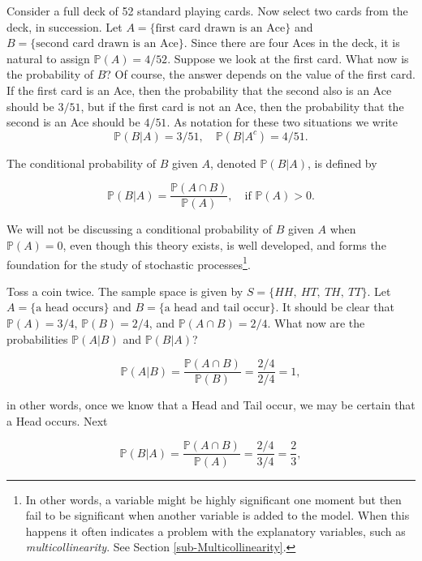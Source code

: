 \documentclass[]{book}
\let\rmarkdownfootnote\footnote%
\def\footnote{\protect\rmarkdownfootnote}
\numberwithin{equation}{chapter}
\numberwithin{figure}{chapter}
\theoremstyle{plain}
\theoremstyle{definition}
\theoremstyle{remark}
\theoremstyle{definition}
\theoremstyle{definition}
\theoremstyle{remark}
\let\BeginKnitrBlock\begin \let\EndKnitrBlock\end
\begin{document}
Consider a full deck of 52 standard playing cards. Now select two cards
from the deck, in succession. Let
\(A = \{ \mbox{first card drawn is an Ace} \}\) and
\(B = \{ \mbox{second card drawn is an Ace} \}\). Since there are four
Aces in the deck, it is natural to assign \(\mathbb{P}(A) = 4/52\).
Suppose we look at the first card. What now is the probability of \(B\)?
Of course, the answer depends on the value of the first card. If the
first card is an Ace, then the probability that the second also is an
Ace should be \(3/51\), but if the first card is not an Ace, then the
probability that the second is an Ace should be \(4/51\). As notation
for these two situations we write \[ 
\mathbb{P}(B\vert A)=3/51,\quad
\mathbb{P}(B\vert A^{c})=4/51.  
\]

\bigskip

\BeginKnitrBlock{definition}
\protect\hypertarget{def:unnamed-chunk-151}{}{\label{def:unnamed-chunk-151}}The
conditional probability of \(B\) given \(A\), denoted
\(\mathbb{P}(B|A)\), is defined by

\begin{equation}
\mathbb{P}(B|A)=\frac{\mathbb{P}(A\cap B)}{\mathbb{P}(A)},\quad \mbox{if }\mathbb{P}(A)>0.
\end{equation}
\EndKnitrBlock{definition}

We will not be discussing a conditional probability of \(B\) given \(A\)
when \(\mathbb{P}(A)=0\), even though this theory exists, is well
developed, and forms the foundation for the study of stochastic
processes\footnote{In other words, a variable might be highly
  significant one moment but then fail to be significant when another
  variable is added to the model. When this happens it often indicates a
  problem with the explanatory variables, such as
  \emph{multicollinearity}. See Section \ref{sub-Multicollinearity}.}.

Toss a coin twice. The sample space is given by \(S=\{ HH,\ HT,\ TH,\
TT \}\). Let \(A= \{ \mbox{a head occurs} \}\) and
\(B= \{ \mbox{a head and tail occur} \}\). It should be clear that
\(\mathbb{P}(A)=3/4\), \(\mathbb{P}(B)=2/4\), and
\(\mathbb{P}(A\cap B)=2/4\). What now are the probabilities
\(\mathbb{P}(A|B)\) and \(\mathbb{P}(B|A)\)?

\[ \mathbb{P}(A|B)=\frac{\mathbb{P}(A\cap
B)}{\mathbb{P}(B)}=\frac{2/4}{2/4}=1, \]

in other words, once we know that a Head and Tail occur, we may be
certain that a Head occurs. Next

\[ 
\mathbb{P}(B|A)=\frac{\mathbb{P}(A\cap
B)}{\mathbb{P}(A)}=\frac{2/4}{3/4}=\frac{2}{3}, 
\]
\end{document}
